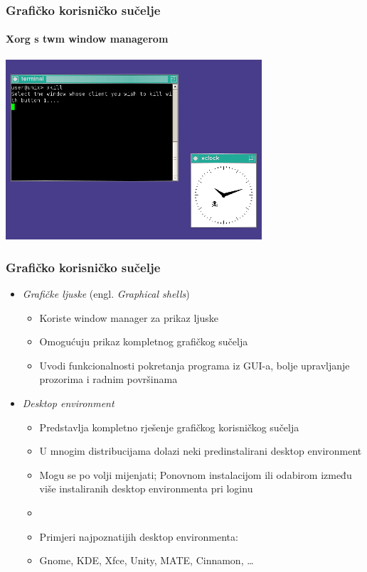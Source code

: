 \documentclass[table,usenames,dvipsnames]{beamer}
\begin{document}
\begin{frame}[t]
	\frametitle{Grafičko korisničko sučelje}
	\framesubtitle{Xorg s twm window managerom}
	\centering \includegraphics[width=270pt]{xorg.png}
\end{frame}

\begin{frame}[t]
	\frametitle{Grafičko korisničko sučelje}
	\begin{itemize}
		\item \emph{Grafičke ljuske} (engl. \emph{Graphical shells})
		\begin{itemize}
			\item Koriste window manager za prikaz ljuske
			\item Omogućuju prikaz kompletnog grafičkog sučelja
			\item Uvodi funkcionalnosti pokretanja programa iz GUI-a, bolje upravljanje prozorima i radnim površinama
		\end{itemize}
		\item \emph{Desktop environment}
		\begin{itemize}
			\item Predstavlja kompletno rješenje grafičkog korisničkog sučelja
			\item U mnogim distribucijama dolazi neki predinstalirani desktop environment
			\item Mogu se po volji mijenjati; Ponovnom instalacijom ili odabirom između više instaliranih desktop environmenta pri loginu
			\item[]
			\item Primjeri najpoznatijih desktop environmenta:
			\item[] Gnome, KDE, Xfce, Unity, MATE, Cinnamon, \ldots
		\end{itemize}
	\end{itemize}
\end{frame}
\end{document}
